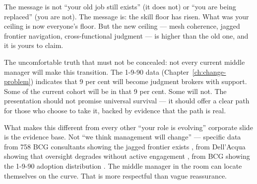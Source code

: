\begin{keyinsight}
The message is not ``your old job still exists'' (it does not) or ``you are being replaced'' (you are not). The message is: the skill floor has risen. What was your ceiling is now everyone's floor. But the new ceiling --- mesh coherence, jagged frontier navigation, cross-functional judgment --- is higher than the old one, and it is yours to claim.

The uncomfortable truth that must not be concealed: not every current middle manager will make this transition. The 1-9-90 data (Chapter~\ref{ch:change-problem}) indicates that 9 per cent will become judgment brokers with support. Some of the current cohort will be in that 9 per cent. Some will not. The presentation should not promise universal survival --- it should offer a clear path for those who choose to take it, backed by evidence that the path is real.
\end{keyinsight}

What makes this different from every other ``your role is evolving'' corporate slide is the evidence base. Not ``we think management will change'' --- specific data from 758 BCG consultants showing the jagged frontier exists \parencite{DellAcqua2026}, from Dell'Acqua showing that oversight degrades without active engagement \parencite{DellAcqua2023}, from BCG showing the 1-9-90 adoption distribution \parencite{BCGAgenticShift2025}. The middle manager in the room can locate themselves on the curve. That is more respectful than vague reassurance.
